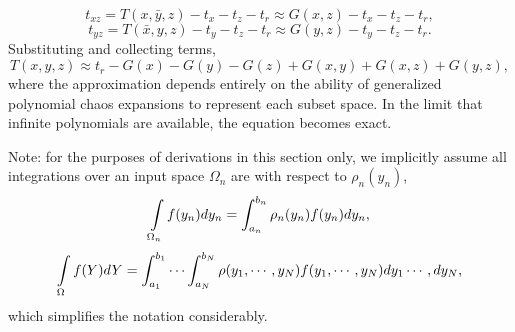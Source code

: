 \begin{equation}
  t_{xz} = T(x, \bar y, z) - t_x - t_z - t_r \approx G(x,z) - t_x - t_z - t_r,
\end{equation}
\begin{equation}
  t_{yz} = T(\bar x, y, z) - t_y - t_z - t_r \approx G(y,z) - t_y - t_z - t_r.
\end{equation}
Substituting and collecting terms,
\begin{equation}\label{eq:simplehdmr}
  T(x,y,z) \approx t_r - G(x) - G(y) - G(z) + G(x,y) + G(x,z) + G(y,z),
\end{equation}
where the approximation depends entirely on the ability of generalized polynomial chaos expansions to
represent each subset space.  In the limit that infinite polynomials are available, the equation becomes
exact.

Note: for the purposes of derivations in this section only, we implicitly assume all integrations over an input
space $\Omega_n$ are with respect to $\rho_n(y_n)$,
\begin{equation}
  \int\limits_{\Omega_n} f(y_n) dy_n = \int_{a_n}^{b_n} \rho_n(y_n) f(y_n) dy_n,
\end{equation}
\begin{equation}
  \int\limits_{\Omega} f(Y) dY = \int_{a_1}^{b_1}\cdots\int_{a_N}^{b_N} \rho(y_1,\cdots,y_N) f(y_1,\cdots,y_N) dy_1\cdots,dy_N,
\end{equation}
which simplifies the notation considerably.


